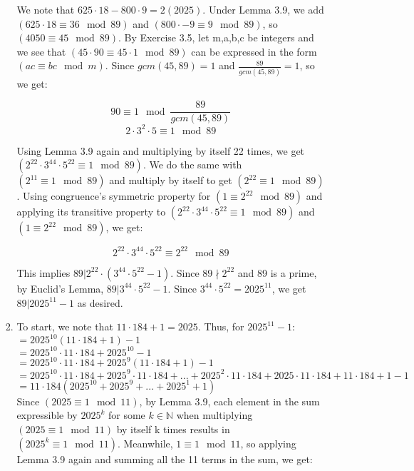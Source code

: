 \documentclass{article}
\begin{document}
\begin{enumerate}[leftmargin=*, label=\arabic*.]
\begin{enumerate}[label=\alph*)]
\begin{enumerate}[label=\alph*)]
        We note that $625 \cdot 18 - 800 \cdot 9 = 2(2025)$. Under Lemma 3.9, we add $(625 \cdot 18 \equiv 36 \mod 89)$ and $(800 \cdot -9 \equiv 9 \mod 89)$, so $(4050 \equiv 45 \mod 89)$.  By Exercise 3.5, let m,a,b,c be integers and we see that $(45 \cdot 90 \equiv 45 \cdot 1 \mod 89)$ can be expressed in the form $(ac \equiv bc \mod m)$. Since $gcm(45, 89) = 1$ and $\frac{89}{gcm(45, 89)} = 1$, so we get:
        
        $$90 \equiv 1 \mod \frac{89}{gcm(45, 89)}$$
        $$2 \cdot 3^2 \cdot 5 \equiv 1 \mod 89$$

        Using Lemma 3.9 again and multiplying by itself 22 times, we get $(2^{22} \cdot 3^{44} \cdot 5^{22} \equiv 1 \mod 89)$. We do the same with $(2^{11} \equiv 1 \mod 89)$ and multiply by itself to get $(2^{22} \equiv 1 \mod 89)$. Using congruence's symmetric property for $(1 \equiv 2^{22} \mod 89)$ and applying its transitive property to $(2^{22} \cdot 3^{44} \cdot 5^{22}\equiv 1 \mod 89)$ and $(1 \equiv 2^{22} \mod 89)$, we get:
        
        $$2^{22} \cdot 3^{44} \cdot 5^{22} \equiv 2^{22} \mod 89$$

        This implies $89 | 2^{22} \cdot (3^{44} \cdot 5^{22} - 1)$. Since $89 \nmid 2^{22}$ and 89 is a prime, by Euclid's Lemma, $89 | 3^{44} \cdot 5^{22} - 1$. Since $3^{44} \cdot 5^{22} = 2025^{11}$, we get $89| 2025^{11} - 1$ as desired. \\
        
        \item 
        To start, we note that $11 \cdot 184 + 1 = 2025$. Thus, for $2025^{11} - 1:$\\

        $= 2025^{10}(11 \cdot 184 + 1) - 1$ \\
        $= 2025^{10}\cdot 11 \cdot 184 + 2025^{10} - 1 $\\
        $= 2025^{10}\cdot 11 \cdot 184 + 2025^{9}(11\cdot 184 + 1) - 1 $\\
        $= 2025^{10}\cdot11\cdot184 + 2025^{9}\cdot11\cdot184 + ... + 2025^2\cdot11\cdot184 + 2025\cdot11\cdot184 + 11\cdot184 + 1 - 1$
        $= 11 \cdot 184 (2025^{10} + 2025^9 + ... + 2025^1 + 1 )$ \\
        
        Since $(2025 \equiv 1 \mod 11)$, by Lemma 3.9, each element in the sum expressible by $2025^k$ for some $k \in \mathbb{N}$ when multiplying $(2025 \equiv 1 \mod 11)$ by itself k times results in $(2025^k \equiv 1 \mod 11)$. Meanwhile, $1 \equiv 1 \mod 11$, so applying Lemma 3.9 again and summing all the 11 terms in the sum, we get: 


\end{enumerate}
\end{enumerate}
\end{enumerate}
\end{document}
